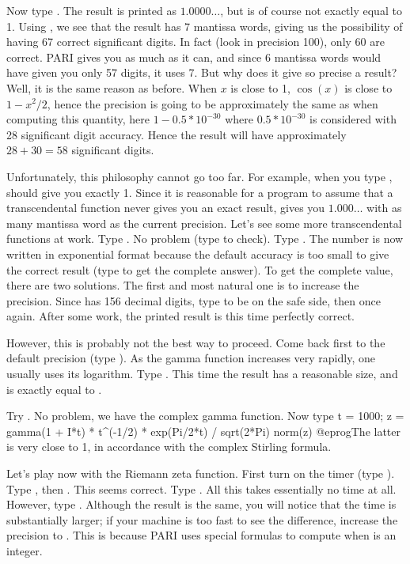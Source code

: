 Now type . The result is printed as $1.0000\dots$, but
is of course not exactly equal to 1. Using \kbd{\#\%}, we see that the
result has 7 mantissa words, giving us the possibility of having 67
correct significant digits. In fact (look in precision 100), only 60 are
correct. PARI gives you as much as it can, and since 6 mantissa words
would have given you only 57 digits, it uses 7. But why does it give so
precise a result? Well, it is the same reason as before. When $x$ is close
to 1, $\cos(x)$ is close to $1-x^2/2$, hence the precision is going to be
approximately the same as when computing this quantity, here $1-0.5*10^{-30}$
where $0.5*10^{-30}$ is considered with 28 significant digit accuracy. Hence the
result will have approximately $28+30=58$ significant digits.

Unfortunately, this philosophy cannot go too far. For example, when you
type ,  should give you exactly 1. Since it is reasonable for
a program to assume that a transcendental function never gives you an exact
result,  gives you $1.000\dots$ with as many mantissa word as the current
precision.
\medskip
Let's see some more transcendental functions at work. Type
. No problem (type  to check). Type .
The number is now written in exponential format because the default
accuracy is too small to give the correct result (type  to get the
complete answer).
To get the complete value, there are two solutions. The first and most natural
one is to increase the precision. Since  has 156 decimal
digits, type  to be on the safe side, then 
once again. After some work, the printed result is this time perfectly
correct.

However, this is probably not the best way to proceed. Come back first to the
default precision (type ). As the gamma function increases
very rapidly, one usually uses its logarithm. Type . This
time the result has a reasonable size, and is exactly equal to .

Try . No problem, we have the complex gamma function.
Now type
\bprog
  t = 1000;
  z = gamma(1 + I*t) * t^(-1/2) * exp(Pi/2*t) / sqrt(2*Pi)
  norm(z)
@eprog\noindent The latter is very close to 1, in accordance with the complex
Stirling formula.
\smallskip

Let's play now with the Riemann zeta function. First turn on the timer (type
\kbd{\#}). Type , then . This seems correct. Type
. All this takes essentially no time at all. However, type
. Although the result is the same, you will notice that the
time is substantially larger; if your machine is too fast to see the
difference, increase the precision to . This is because PARI
uses special formulas to compute  when  is an integer.


